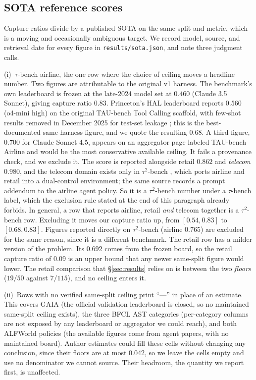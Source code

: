 \documentclass{article}
\theoremstyle{plain}
\theoremstyle{definition}
\begin{document}
\subsection{SOTA reference scores}
\label{app:sota}
Capture ratios divide by a published SOTA on the same split and metric, which is a moving and occasionally ambiguous target. We record model, source, and retrieval date for every figure in \texttt{results/sota.json}, and note three judgment calls.

(i)~$\tau$-bench airline, the one row where the choice of ceiling moves a headline number. Two figures are attributable to the original v1 harness. The benchmark's own leaderboard is frozen at the late-2024 model set at $0.460$ (Claude 3.5 Sonnet), giving capture ratio $0.83$. Princeton's HAL leaderboard reports $0.560$ (o4-mini high) on the original TAU-bench Tool Calling scaffold, with few-shot results removed in December 2025 for test-set leakage \citep{hal2025taubench}; this is the best-documented same-harness figure, and we quote the resulting $0.68$. A third figure, $0.700$ for Claude Sonnet 4.5, appears on an aggregator page labeled TAU-bench Airline and would be the most conservative available ceiling. It fails a provenance check, and we exclude it. The score is reported alongside retail $0.862$ and \emph{telecom} $0.980$, and the telecom domain exists only in $\tau^2$-bench \citep{barres2025tau2}, which ports airline and retail into a dual-control environment; the same source records a prompt addendum to the airline agent policy. So it is a $\tau^2$-bench number under a $\tau$-bench label, which the exclusion rule stated at the end of this paragraph already forbids. In general, a row that reports airline, retail \emph{and} telecom together is a $\tau^2$-bench row. Excluding it moves our capture ratio up, from $[0.54, 0.83]$ to $[0.68, 0.83]$. Figures reported directly on $\tau^2$-bench (airline $0.765$) are excluded for the same reason, since it is a different benchmark. The retail row has a milder version of the problem. Its $0.692$ comes from the frozen board, so the retail capture ratio of $0.09$ is an upper bound that any newer same-split figure would lower. The retail comparison that \S\ref{sec:results} relies on is between the two \emph{floors} ($19/50$ against $7/115$), and no ceiling enters it.

(ii)~Rows with no verified same-split ceiling print ``---'' in place of an estimate. This covers GAIA (the official validation leaderboard is closed, so no maintained same-split ceiling exists), the three BFCL AST categories (per-category columns are not exposed by any leaderboard or aggregator we could reach), and both ALFWorld policies (the available figures come from agent papers, with no maintained board). Author estimates could fill these cells without changing any conclusion, since their floors are at most $0.042$, so we leave the cells empty and use no denominator we cannot source. Their headroom, the quantity we report first, is unaffected.
\end{document}
